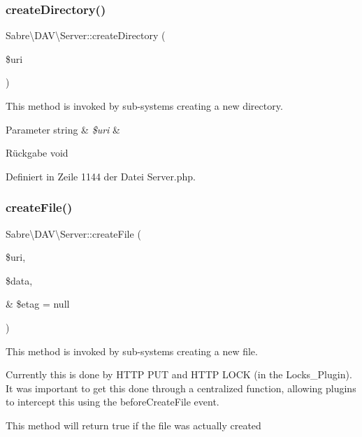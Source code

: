 \subsubsection{\texorpdfstring{create\+Directory()}{createDirectory()}}
{\footnotesize\ttfamily Sabre\textbackslash{}\+D\+A\+V\textbackslash{}\+Server\+::create\+Directory (\begin{DoxyParamCaption}\item[{}]{\$uri }\end{DoxyParamCaption})}

This method is invoked by sub-\/systems creating a new directory.


\begin{DoxyParams}[1]{Parameter}
string & {\em \$uri} & \\
\hline
\end{DoxyParams}
\begin{DoxyReturn}{Rückgabe}
void 
\end{DoxyReturn}


Definiert in Zeile 1144 der Datei Server.\+php.

\mbox{\label{class_sabre_1_1_d_a_v_1_1_server_a7bee663affd9e5dfe5f50ca8559ee9a8}} 
\subsubsection{\texorpdfstring{create\+File()}{createFile()}}
{\footnotesize\ttfamily Sabre\textbackslash{}\+D\+A\+V\textbackslash{}\+Server\+::create\+File (\begin{DoxyParamCaption}\item[{}]{\$uri,  }\item[{}]{\$data,  }\item[{\&}]{\$etag = {\ttfamily null} }\end{DoxyParamCaption})}

This method is invoked by sub-\/systems creating a new file.

Currently this is done by H\+T\+TP P\+UT and H\+T\+TP L\+O\+CK (in the Locks\+\_\+\+Plugin). It was important to get this done through a centralized function, allowing plugins to intercept this using the before\+Create\+File event.

This method will return true if the file was actually created


